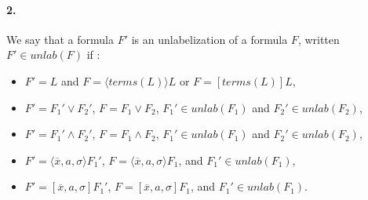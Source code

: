 \documentclass[a4paper,10pt]{report}
\newcommand{\terms}{\mathit{terms}}
\newcommand{\unlab}{\mathit{unlab}}
\begin{document}
\paragraph{2.}
We say that a formula $F'$ is an unlabelization of a formula $F$, written $F'\in\unlab(F)$ if :
\begin{itemize}
 \item $F'= L$ and $F =\langle\terms(L)\rangle L$ or $F = [\terms(L)]L$,
 \item $F'= F_1'\vee F_2'$, $F = F_1\vee F_2$, $F_1'\in\unlab(F_1)$ and $F_2'\in\unlab(F_2)$,
 \item $F'= F_1'\wedge F_2'$, $F = F_1\wedge F_2$, $F_1'\in\unlab(F_1)$ and $F_2'\in\unlab(F_2)$,
 \item $F'=\langle\overline x, a,\sigma\rangle F_1'$, $F =\langle\overline x, a,\sigma\rangle F_1$,
and $F_1'\in\unlab(F_1)$,
 \item $F' = [\overline x, a,\sigma]F_1'$, $F = [\overline x, a,\sigma]F_1$,
and $F_1'\in\unlab(F_1)$.
\end{itemize}
\end{document}
